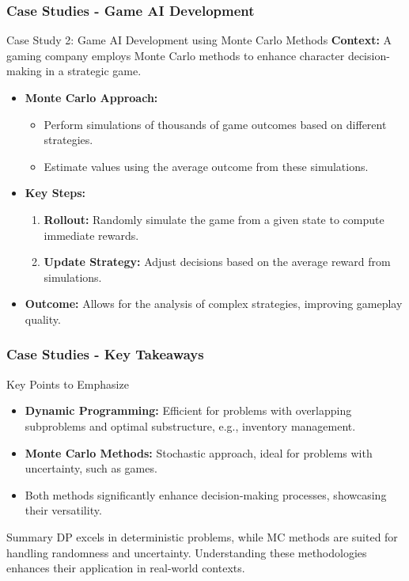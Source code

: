 \documentclass[aspectratio=169]{beamer}
\begin{document}
\begin{frame}[fragile]
    \frametitle{Case Studies - Game AI Development}
    \begin{block}{Case Study 2: Game AI Development using Monte Carlo Methods}
        \textbf{Context:} A gaming company employs Monte Carlo methods to enhance character decision-making in a strategic game.
    \end{block}

    \begin{itemize}
        \item \textbf{Monte Carlo Approach:}
        \begin{itemize}
            \item Perform simulations of thousands of game outcomes based on different strategies.
            \item Estimate values using the average outcome from these simulations.
        \end{itemize}
        \item \textbf{Key Steps:}
        \begin{enumerate}
            \item \textbf{Rollout:} Randomly simulate the game from a given state to compute immediate rewards.
            \item \textbf{Update Strategy:} Adjust decisions based on the average reward from simulations.
        \end{enumerate}
        \item \textbf{Outcome:} Allows for the analysis of complex strategies, improving gameplay quality.
    \end{itemize}
\end{frame}

\begin{frame}[fragile]
    \frametitle{Case Studies - Key Takeaways}
    \begin{block}{Key Points to Emphasize}
        \begin{itemize}
            \item \textbf{Dynamic Programming:} Efficient for problems with overlapping subproblems and optimal substructure, e.g., inventory management.
            \item \textbf{Monte Carlo Methods:} Stochastic approach, ideal for problems with uncertainty, such as games.
            \item Both methods significantly enhance decision-making processes, showcasing their versatility.
        \end{itemize}
    \end{block}

    \begin{block}{Summary}
        DP excels in deterministic problems, while MC methods are suited for handling randomness and uncertainty. Understanding these methodologies enhances their application in real-world contexts.
    \end{block}
\end{frame}
\end{document}

